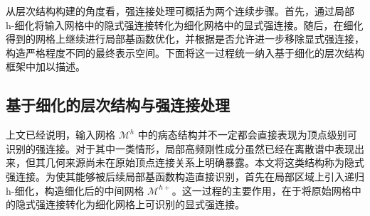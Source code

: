 从层次结构构建的角度看，强连接处理可概括为两个连续步骤。首先，通过局部 h-细化将输入网格中的隐式强连接转化为细化网格中的显式强连接。随后，在细化得到的网格上继续进行局部基函数优化，并根据是否允许进一步移除显式强连接，构造严格程度不同的最终表示空间。下面将这一过程统一纳入基于细化的层次结构框架中加以描述。

\subsection{基于细化的层次结构与强连接处理}

上文已经说明，输入网格 $\mathcal{M}^{h}$ 中的病态结构并不一定都会直接表现为顶点级别可识别的强连接。对于其中一类情形，局部高频刚性成分虽然已经在离散谱中表现出来，但其几何来源尚未在原始顶点连接关系上明确暴露。本文将这类结构称为隐式强连接。为使其能够被后续局部基函数构造直接识别，首先在局部区域上引入递归 h-细化，构造细化后的中间网格 $\mathcal{M}^{h+}$。这一过程的主要作用，在于将原始网格中的隐式强连接转化为细化网格上可识别的显式强连接。

